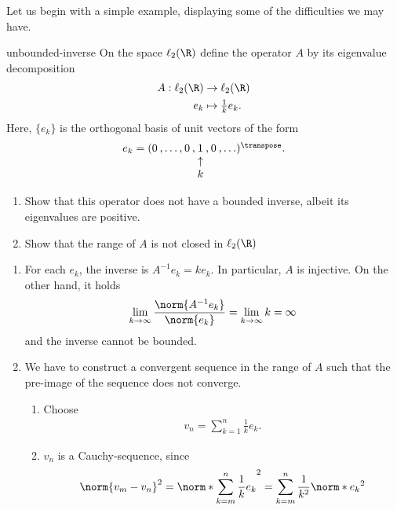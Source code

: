 
Let us begin with a simple example, displaying some of the
difficulties we may have.

\begin{Problem}{unbounded-inverse}
  On the space $\ell_2(\R)$ define the operator $A$ by its eigenvalue
  decomposition
  \begin{align}
    A: \ell_2(\R) &\to \ell_2(\R)\\
    e_k & \mapsto \tfrac1k e_k.
  \end{align}
  Here, $\{e_k\}$ is the orthogonal basis of unit vectors of the form
  \begin{gather}
    \arraycolsep0.1em
    \begin{array}{cccccccc}
      e_k =(0&,\ldots,&0&,&1&,&0&,\ldots)^\transpose.\\
      &&&&\uparrow\\
      &&&&k
    \end{array}
  \end{gather}
  \begin{enumerate}
  \item Show that this operator does not have a bounded inverse, albeit
    its eigenvalues are positive.
  \item Show that the range of $A$ is not closed in $\ell_2(\R)$
  \end{enumerate}
\begin{solution}
  \begin{enumerate}
  \item For each $e_k$, the inverse is $A^{-1} e_k = k e_k$. In particular, $A$ is injective.
    On the other hand, it holds
    \begin{gather}
      \lim_{k\to\infty}\frac{\norm{A^{-1}e_k}}{\norm{e_k}}=\lim_{k\to\infty}k=\infty
    \end{gather}
      and the inverse cannot be bounded.
  \item We have to construct a convergent sequence in the range of $A$
    such that the pre-image of the sequence does not converge.
    \begin{enumerate}
    \item Choose
      \begin{gather}
        v_n = \sum_{k=1}^n \frac1k e_k.
      \end{gather}
      \item $v_n$ is a Cauchy-sequence, since
        \begin{gather}
          \norm{v_m-v_n}^2 = \norm*{\sum_{k=m}^n \frac1k e_k}^2
          = \sum_{k=m}^n \frac1{k^2}\norm*{e_k}^2

\end{gather}
\end{enumerate}
\end{enumerate}
\end{solution}
\end{Problem}
